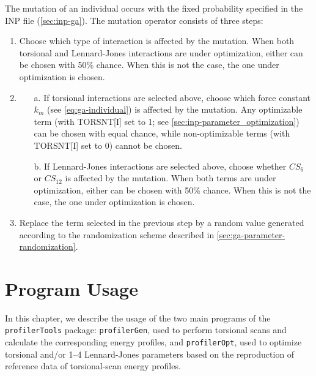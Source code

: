 \documentclass[10pt,a4paper,openany]{memoir}
\numberwithin{equation}{section}
\newcommand{\profileropt}[0]{\texttt{profilerOpt}}
\newcommand{\profilergen}[0]{\texttt{profilerGen}}
\newcommand{\profilertools}[0]{\texttt{profilerTools}}
\begin{document}
The mutation of an individual occurs with the fixed probability specified in the
INP file (\autoref{sec:inp-ga}). The mutation operator
consists of three steps:
\begin{enumerate}
\item Choose which type of interaction is affected by the mutation.  When both
  torsional and Lennard-Jones interactions are under optimization, either can be
  chosen with 50\% chance.  When this is not the case, the one under
  optimization is chosen.
\item
  \begin{enumerate}
  \item [a.] If torsional interactions are selected above, choose
    which force constant $k_m$ (see \autoref{eq:ga-individual}) is
    affected by the mutation. Any optimizable term (with TORSNT[I] set
    to 1; see \autoref{sec:inp-parameter_optimization}) can be chosen with equal
    chance, while non-optimizable terms (with TORSNT[I] set to 0)
    cannot be chosen.
  \item [b.] If Lennard-Jones interactions are selected above, choose whether $CS_6$ or
    $CS_{12}$ is affected by the mutation. When both terms are under
    optimization, either can be chosen with 50\% chance. When this is not the
    case, the one under optimization is chosen.
  \end{enumerate}
\item Replace the term selected in the previous step by a random value generated
  according to the randomization scheme described in
  \autoref{sec:ga-parameter-randomization}.
\end{enumerate}

\chapter{Program Usage}
\label{chap:program-usage}

In this chapter, we describe the usage of the two main programs of the
\profilertools{} package: \profilergen{}, used to perform torsional
scans and calculate the corresponding energy profiles, and
\profileropt{}, used to optimize torsional and/or 1--4 Lennard-Jones
parameters based on the reproduction of reference data of
torsional-scan energy profiles.
\end{document}
